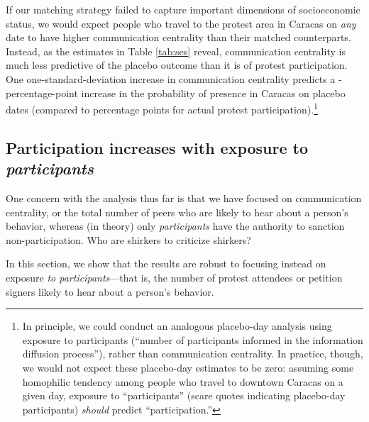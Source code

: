 \documentclass[12pt]{article}
\newcommand{\StepCountInFileNames}{6}
\begin{document}
If our matching strategy failed to capture important dimensions of socioeconomic status, we would expect people who travel to the protest area in Caracas on \emph{any} date to have higher communication centrality than their matched counterparts. Instead, as the estimates in Table \ref{tab:ses} reveal, communication centrality is much less predictive of the placebo outcome than it is of protest participation. One one-standard-deviation increase in communication centrality predicts a \unskip-percentage-point increase in the probability of presence in Caracas on placebo dates (compared to percentage points for actual protest participation).\footnote{In principle, we could conduct an analogous placebo-day analysis using exposure to participants (``number of participants informed in the information diffusion process''), rather than communication centrality. In practice, though, we would not expect these placebo-day estimates to be zero: assuming some homophilic tendency among people who travel to downtown Caracas on a given day, exposure to ``participants'' (scare quotes indicating placebo-day participants) \emph{should} predict ``participation.''}




\subsection{Participation increases with exposure to \emph{participants}}\label{sec:participantexposure}

One concern with the analysis thus far is that we have focused on communication centrality, or the total number of peers who are likely to hear about a person's behavior, whereas (in theory) only \emph{participants} have the authority to sanction non-participation. Who are shirkers to criticize shirkers?

In this section, we show that the results are robust to focusing instead on exposure \emph{to participants}---that is, the number of protest attendees or petition signers likely to hear about a person's behavior.
\end{document}

